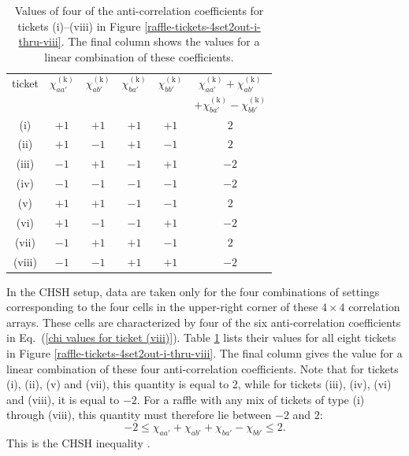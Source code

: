  \begin{table}[ht]
\centering
\begin{tabular}{|c||c|c|c|c||c|}
\hline
ticket & \quad $\chi_{aa'}^{\mathrm{(k)}}$ \quad & \quad $\chi_{ab'}^{\mathrm{(k)}}$ \quad & \quad $\chi_{ba'}^{\mathrm{(k)}}$ \quad & \quad $\chi_{bb'}^{\mathrm{(k)}}$ \quad &  $\chi_{aa'}^{\mathrm{(k)}} +\chi_{ab'}^{\mathrm{(k)}}$ \quad \\[.1cm] 
 &  &  &  &  &  \quad $+\chi_{ba'}^{\mathrm{(k)}} - \chi_{bb'}^{\mathrm{(k)}}$ \quad \\[.1cm]
\hline
 (i) & $+1$ & $+1$ & $+1$ & $+1$ & $2$ \\[.1cm]
 (ii) & $+1$ & $-1$ & $+1$ & $-1$ & $2$ \\[.1cm]
 (iii) & $-1$ & $+1$ & $-1$ & $+1$ & $-2$ \\[.1cm]
(iv) & $-1$ & $-1$ & $-1$ & $-1$ & $-2$ \\[.1cm]
 (v) & $+1$ & $+1$ & $-1$ & $-1$ & $2$ \\[.1cm]
 (vi) & $+1$ & $-1$ & $-1$ & $+1$ & $-2$ \\[.1cm]
 (vii) & $-1$ & $+1$ & $+1$ & $-1$ & $2$ \\[.1cm]
(viii) & $-1$ & $-1$ & $+1$ & $+1$ & $-2$ \\[.1cm]
 \hline
\end{tabular}
\caption{Values of four of the anti-correlation coefficients for tickets (i)--(viii) in Figure \ref{raffle-tickets-4set2out-i-thru-viii}. The final column shows the values for a linear combination of these coefficients.}
\label{values of chi-4set2out}
\end{table}

In the CHSH setup, data are taken only for the four combinations of settings corresponding to the four cells in the upper-right corner of these $4 \times 4$ correlation arrays. These cells are characterized by four of the six anti-correlation coefficients in Eq.\ (\ref{chi values for ticket (viii)}). Table \ref{values of chi-4set2out} lists their values for all eight tickets in Figure \ref{raffle-tickets-4set2out-i-thru-viii}. The final column gives the value for a linear combination of these four anti-correlation coefficients. Note that for tickets (i), (ii), (v) and (vii), this quantity is equal to 2, while for tickets (iii), (iv), (vi) and (viii), it is equal to $-2$. For a raffle with any mix of tickets of type (i) through (viii), this quantity must therefore lie between $-2$ and $2$:
\begin{equation}
-2 \le \chi_{aa'} + \chi_{ab'} + \chi_{ba'} - \chi_{bb'} \le 2.
\label{CHSH inequality}
\end{equation}
This is the CHSH inequality \citep[p.\ 68]{Bub 2016}.


